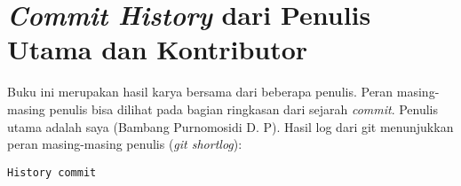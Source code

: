\chapter{\textit{Commit History} dari Penulis Utama dan Kontributor}

Buku ini merupakan hasil karya bersama dari beberapa penulis. Peran masing-masing penulis bisa dilihat pada bagian ringkasan dari sejarah \textit{commit}. Penulis utama adalah saya (Bambang Purnomosidi D. P). Hasil log dari git menunjukkan peran masing-masing penulis (\textit{git shortlog}):

\begin{lstlisting}
History commit
\end{lstlisting}

